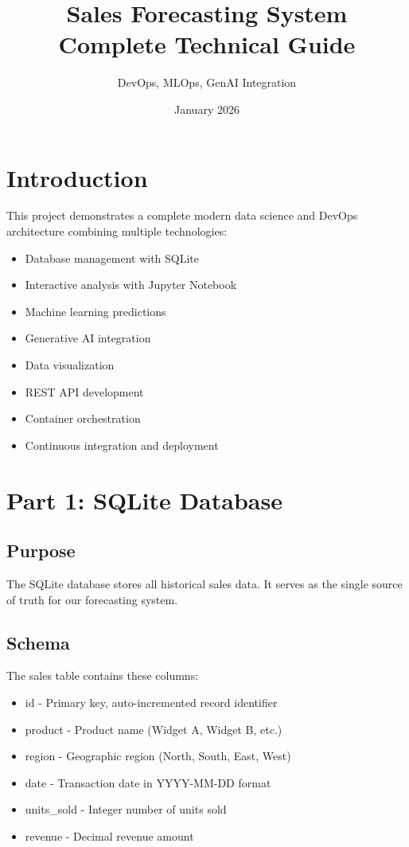 \documentclass{article}
\title{Sales Forecasting System \\ Complete Technical Guide}
\author{DevOps, MLOps, GenAI Integration}
\date{January 2026}
\begin{document}
\maketitle

\tableofcontents

\section{Introduction}

This project demonstrates a complete modern data science and DevOps architecture combining multiple technologies:

\begin{itemize}
\item Database management with SQLite
\item Interactive analysis with Jupyter Notebook
\item Machine learning predictions
\item Generative AI integration
\item Data visualization
\item REST API development
\item Container orchestration
\item Continuous integration and deployment
\end{itemize}

\section{Part 1: SQLite Database}

\subsection{Purpose}

The SQLite database stores all historical sales data. It serves as the single source of truth for our forecasting system.

\subsection{Schema}

The sales table contains these columns:

\begin{itemize}
\item id - Primary key, auto-incremented record identifier
\item product - Product name (Widget A, Widget B, etc.)
\item region - Geographic region (North, South, East, West)
\item date - Transaction date in YYYY-MM-DD format
\item units\_sold - Integer number of units sold
\item revenue - Decimal revenue amount
\end{itemize}
\end{document}
